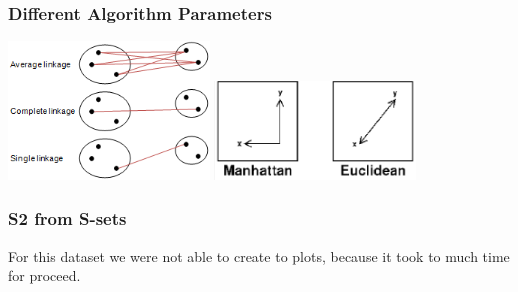 \documentclass[xcolor={usenames,dvipsnames}, 
	hyperref={
	colorlinks=true, 						%
	linkcolor=black, 						%
	urlcolor=black,							%
	citecolor=black,						%
	pdfpagelabels=false,
	},
	ignorenonframetext,			%
	compress					%
]{beamer}
\begin{document}
\begin{frame}
	\frametitle{Different Algorithm Parameters}
	
	\includegraphics[width=0.4\textwidth]{plots/clustering_distances.png}
	\hfill
	\includegraphics[width=0.4\textwidth]{plots/diagram.png}
	
\end{frame}


\begin{frame}
   \frametitle{S2 from S-sets}

For this dataset we were not able to create to plots, because it took to much time for proceed.

\end{frame}
\end{document}
